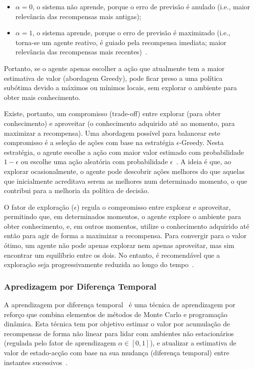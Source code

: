\begin{itemize}
    \item $\alpha = 0$, o sistema não aprende, porque o erro de previsão é anulado (i.e., maior relevância das recompensas mais antigas);
    \item $\alpha = 1$, o sistema aprende, porque o erro de previsão é maximizado (i.e., torna-se um agente reativo, é guiado pela recompensa imediata; maior relevância das recompensas mais recentes)~\cite{isel:iasa:slides:aprendizagem-por-reforco}.
\end{itemize}

Portanto, se o agente apenas escolher a ação que atualmente tem a maior estimativa de valor (abordagem Greedy), pode ficar preso a uma política subótima devido a máximos ou mínimos locais, sem explorar o ambiente para obter mais conhecimento.

Existe, portanto, um compromisso (trade-off) entre explorar (para obter conhecimento) e aproveitar (o conhecimento adquirido até ao momento, para maximizar a recompensa).
Uma abordagem possível para balancear este compromisso é a seleção de ações com base na estratégia $\epsilon$-Greedy.
Nesta estratégia, o agente escolhe a ação com maior valor estimado com probabilidade $1 - \epsilon$ ou escolhe uma ação aleatória com probabilidade $\epsilon$~\cite{isel:iasa:slides:aprendizagem-por-reforco}.
A ideia é que, ao explorar ocasionalmente, o agente pode descobrir ações melhores do que aquelas que inicialmente acreditava serem as melhores num determinado momento, o que contribui para a melhoria da política de decisão.

O fator de exploração ($\epsilon$) regula o compromisso entre explorar e aproveitar, permitindo que, em determinados momentos, o agente explore o ambiente para obter conhecimento, e, em outros momentos, utilize o conhecimento adquirido até então para agir de forma a maximizar a recompensa.
Para convergir para o valor ótimo, um agente não pode apenas explorar nem apenas aproveitar, mas sim encontrar um equilíbrio entre os dois.
No entanto, é recomendável que a exploração seja progressivamente reduzida ao longo do tempo~\cite{isel:iasa:slides:aprendizagem-por-reforco}.

\subsubsection{Apredizagem por Diferença Temporal}\label{subsubsec:aprendizagem-por-diferenca-temporal}

A aprendizagem por diferença temporal~\cite{wiki:temporal-difference-learning} é uma técnica de aprendizagem por reforço que combina elementos de métodos de Monte Carlo e programação dinâmica.
Esta técnica tem por objetivo estimar o valor por acumulação de recompensas de forma
não linear para lidar com ambientes não estacionários (regulada pelo fator de aprendizagem $\alpha \in [0,1]$), e atualizar a estimativa de valor de estado-acção com base na sua mudança (diferença temporal) entre instantes sucessivos~\cite{isel:iasa:slides:aprendizagem-por-reforco}.


